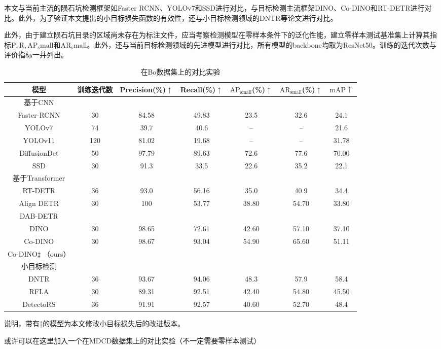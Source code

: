 本文与当前主流的陨石坑检测框架如Faster RCNN、YOLOv7和SSD进行对比，与目标检测主流框架DINO、Co-DINO和RT-DETR进行对比。此外，为了验证本文提出的小目标损失函数的有效性，还与小目标检测领域的DNTR等论文进行对比。
\par 此外，由于建立陨石坑目录的区域尚未存在为标注文件，应当考察检测模型在零样本条件下的泛化性能，建立零样本测试基准集\cite{boCatalogueMeterscaleImpact2022}上计算其指标$\mathrm{P,R,AP_small}$和$\mathrm{AR_small}$。此外，还与当前目标检测领域的先进模型进行对比，所有模型的backbone均取为ResNet50。训练的迭代次数与评价指标一并列出。
\begin{table}[H]
  \begin{center}
  \caption{在Bo\cite{boCatalogueMeterscaleImpact2022}数据集上的对比实验}
  \label{tab:detect-comp}
  \begin{tabular}{ c  c  c  c  c  c c}
  \toprule
  模型 & 训练迭代数 & 
  Precision(\%)$\uparrow$ & Recall(\%)$\uparrow$ & $\mathrm{AP}_\mathrm{small}$(\%)$\uparrow$ & $\mathrm{AR}_\mathrm{small}$(\%)$\uparrow$& $\mathrm{mAP}\uparrow$ \\
  \hline
  基于CNN & & & & & & \\
  Faster-RCNN & 30 & 84.58 & 49.83 & 23.5 & 32.6 & 24.1\\
  YOLOv7 & 74 & 39.7 & 40.6 & -- & -- & 21.6 \\
  YOLOv11 & 120 & 81.02 & 19.68 & -- & -- & 31.78\\
  DiffusionDet &50 & 97.79 & 89.63 & 72.6 & 77.6 & 70.00  \\
  SSD & 30 & 91.3 &33.5 &22.6 &35.2&22.1 \\
  \hline
  基于Transformer & & & & && \\
  RT-DETR & 36 & 93.0 & 56.16 & 35.0 & 40.9& 34.4\\
  Align DETR&30 & 100 & 53.77 & 38.80 & 54.70 & 33.80\\
  DAB-DETR & & & & & &\\
  DINO &30 &98.65 &72.61 &42.60 &57.10 &37.10\\
  Co-DINO &30 &98.67 & 93.04 & 54.90 & 65.60 & 51.11\\
  Co-DINO$\ddagger$ （ours）& & & & & &\\
  \hline
  小目标检测 & & & & & & \\
  DNTR\cite{liuDeNoisingFPNTransformer2024}& 36 & 93.67 & 94.06 & 48.3 & 57.9 & 58.4  \\
  RFLA\cite{xuRFLAGaussianReceptive2022} & 30 & 89.31 & 92.51 & 42.40 & 54.80 & 45.50 \\
  DetectoRS\cite{Qiao2020DetectoRSDO} & 36  & 91.91 & 92.57 & 40.60 & 52.70 & 48.4 \\
  \bottomrule 
  \end{tabular}
  \end{center}
\end{table}
说明，带有$\ddagger$的模型为本文修改小目标损失后的改进版本。
\par 或许可以在这里加入一个在MDCD数据集上的对比实验（不一定需要零样本测试）

